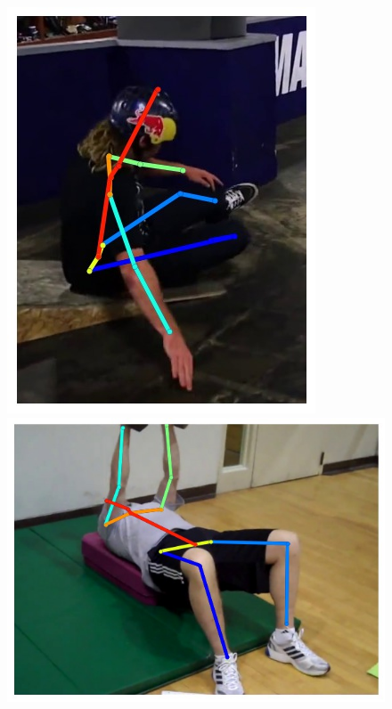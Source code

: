 \begin{figure}[t!]
    \includegraphics[height=\flowh]{Figures/pose/qualitative/pred-3}
    \hfill
    \includegraphics[height=\flowh]{Figures/pose/qualitative/pred-4}
    \hfill

\end{figure}
